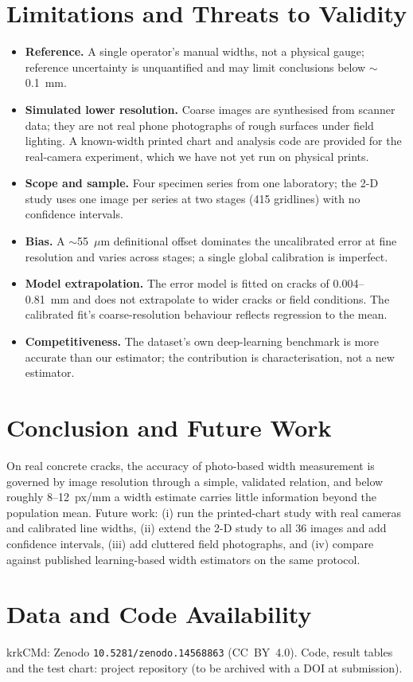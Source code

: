 \documentclass[conference]{IEEEtran}
\begin{document}
\section{Limitations and Threats to Validity}\label{sec:limits}
\begin{itemize}
\item \textbf{Reference.} A single operator's manual widths, not a physical gauge; reference uncertainty is unquantified and may limit conclusions below $\sim$0.1~mm.
\item \textbf{Simulated lower resolution.} Coarse images are synthesised from scanner data; they are not real phone photographs of rough surfaces under field lighting. A known-width printed chart and analysis code are provided for the real-camera experiment, which we have not yet run on physical prints.
\item \textbf{Scope and sample.} Four specimen series from one laboratory; the 2-D study uses one image per series at two stages (415 gridlines) with no confidence intervals.
\item \textbf{Bias.} A $\sim$55~$\mu$m definitional offset dominates the uncalibrated error at fine resolution and varies across stages; a single global calibration is imperfect.
\item \textbf{Model extrapolation.} The error model is fitted on cracks of 0.004--0.81~mm and does not extrapolate to wider cracks or field conditions. The calibrated fit's coarse-resolution behaviour reflects regression to the mean.
\item \textbf{Competitiveness.} The dataset's own deep-learning benchmark is more accurate than our estimator; the contribution is characterisation, not a new estimator.
\end{itemize}

\section{Conclusion and Future Work}
On real concrete cracks, the accuracy of photo-based width measurement is governed by image resolution through a simple, validated relation, and below roughly 8--12~px/mm a
width estimate carries little information beyond the population mean. Future work: (i) run the printed-chart study with real cameras and calibrated line widths, (ii) extend the 2-D study to all 36 images and add confidence intervals,
(iii) add cluttered field photographs, and (iv) compare against published learning-based width estimators on the same protocol.

\section*{Data and Code Availability}
krkCMd: Zenodo \texttt{10.5281/zenodo.14568863} (CC~BY~4.0). Code, result tables and the test chart: project repository (to be archived with a DOI at submission).



\end{document}
